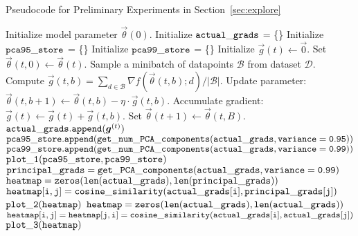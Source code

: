 \begin{algorithm}[h!]
{\footnotesize 
  \caption{Pseudocode for Preliminary Experiments in Section~\ref{sec:explore}}
\label{alg:pseudo}
\begin{algorithmic}[1]
    \State Initialize model parameter $\vec{\theta}{}{(0)}$.
    \State Initialize ${\tt actual\_grads}$ = \{\} 
    \State Initialize ${\tt pca95\_store}$ = \{\} 
    \State Initialize ${\tt pca99\_store}$ = \{\} 
    \Statex
     
        \State Initialize $\vec{g}{}{(t)} \leftarrow \vec{0}{}{}$. 
        \State Set $\vec{\theta}{}{(t,0)} \leftarrow \vec{\theta}{}{(t)}$.
         
            \State Sample a minibatch of  datapoints $\mathcal{B}$ from dataset $\mathcal{D}$. 
            \State Compute $\vec{g}{}{(t,b)}= \sum_{d\in \mathcal{B}} \nabla f(\vec{\theta}{}{(t,b)};d)/|\mathcal{B}|$.
            \State Update parameter: $\vec{\theta}{}{(t,b+1)} \leftarrow \vec{\theta}{}{(t,b)} - \eta \cdot \vec{g}{}{(t,b)}$.
            \State Accumulate gradient: $\vec{g}{}{(t)} \leftarrow \vec{g}{}{(t)} + \vec{g}{}{(t,b)}$.
        \EndFor    
        \State Set $\vec{\theta}{}{(t+1)} \leftarrow \vec{\theta}{}{(t, B)}$.
        \State ${\tt actual\_grads.append(} \vec{g}{}{(t)} {\tt )}$ 
        \State ${\tt pca95\_store.append(get\_num\_PCA\_components(actual\_grads, variance=0.95))}$
        \State ${\tt pca99\_store.append(get\_num\_PCA\_components(actual\_grads, variance=0.99))}$
        \Statex
    \EndFor
    \Statex
    \State ${\tt plot\_1(pca95\_store, pca99\_store)}$ 
    \Statex
    \State ${\tt principal\_grads = get\_PCA\_components(actual\_grads, variance=0.99)}$
    \State ${\tt heatmap = zeros(len(actual\_grads), len(principal\_grads))}$
            \State ${\tt heatmap[i,j] = cosine\_similarity(actual\_grads[i], principal\_grads[j])}$
        \EndFor
    \EndFor
    \Statex
    \State ${\tt plot\_2(heatmap)}$ 
    \Statex
    \State ${\tt heatmap = zeros(len(actual\_grads), len(actual\_grads))}$
            \State ${\tt heatmap[i,j] = heatmap[j, i]= cosine\_similarity(actual\_grads[i], actual\_grads[j])}$
        \EndFor
    \EndFor
    \Statex
    \State ${\tt plot\_3(heatmap)}$ 
\end{algorithmic}
}
\end{algorithm}

